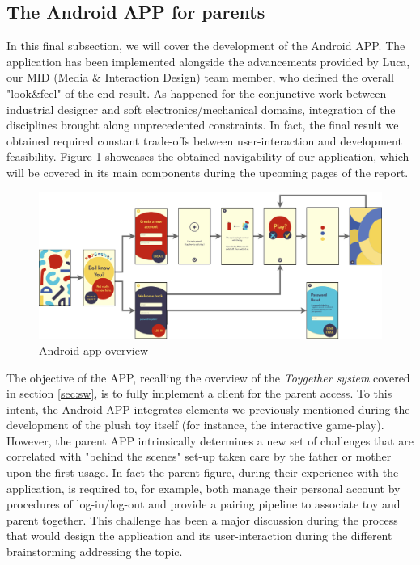 \newpage
\subsection{The Android APP for parents}
\label{subsec:android} 

In this final subsection, we will cover the development of the Android APP. The application has been implemented alongside the advancements provided by Luca, our MID (Media \& Interaction Design) team member, who defined the overall "look\&feel" of the end result. As happened for the conjunctive work between industrial designer and soft electronics/mechanical domains, integration of the disciplines brought along unprecedented constraints. In fact, the final result we obtained required constant trade-offs between user-interaction and development feasibility. Figure \ref{fig:SE_android_overview} showcases the obtained navigability of our application, which will be covered in its main components during the upcoming pages of the report.

\begin{figure}[ht]
    \centering
    \includegraphics[scale=0.4]{images/SE_android_overview.png}
    \caption{Android app overview}
    \label{fig:SE_android_overview}
\end{figure}

\medskip
The objective of the APP, recalling the overview of the \textit{Toygether system} covered in section \ref{sec:sw}, is to fully implement a client for the parent access. To this intent, the Android APP integrates elements we previously mentioned during the development of the plush toy itself (for instance, the interactive game-play). However, the parent APP intrinsically determines a new set of challenges that are correlated with "behind the scenes" set-up taken care by the father or mother upon the first usage. In fact the parent figure, during their experience with the application, is required to, for example, both manage their personal account by procedures of log-in/log-out and provide a pairing pipeline to associate toy and parent together. This challenge has been a major discussion during the process that would design the application and its user-interaction during the different brainstorming addressing the topic.

